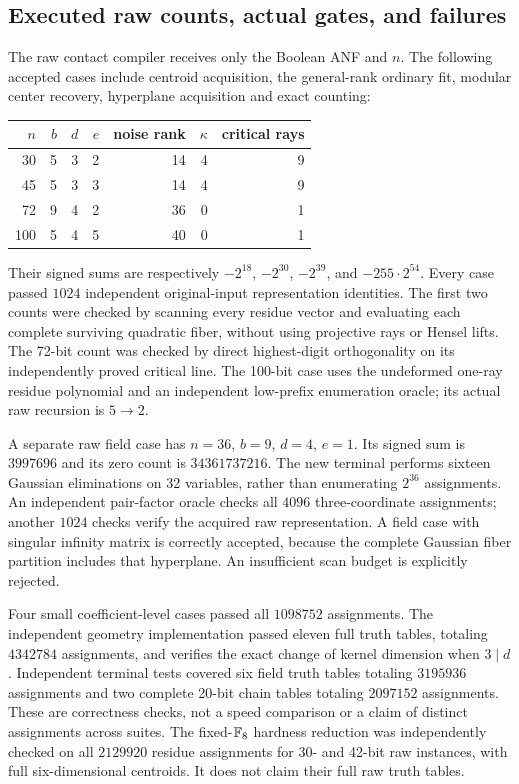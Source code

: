 \subsection{Executed raw counts, actual gates, and failures}
The raw contact compiler receives only the Boolean ANF and $n$.
The following accepted cases include centroid acquisition, the general-rank
ordinary fit, modular center recovery, hyperplane acquisition and exact counting:
\begin{center}
\small
\begin{tabular}{rrrrrrr}
\toprule
$n$&$b$&$d$&$e$&noise rank&$\kappa$&critical rays\\
\midrule
30&5&3&2&14&4&9\\
45&5&3&3&14&4&9\\
72&9&4&2&36&0&1\\
100&5&4&5&40&0&1\\
\bottomrule
\end{tabular}
\end{center}
Their signed sums are respectively $-2^{18}$, $-2^{30}$, $-2^{39}$,
and $-255\cdot2^{54}$. Every case passed $1024$ independent original-input
representation identities. The first two counts were checked by scanning
every residue vector and evaluating each complete surviving quadratic
fiber, without using projective rays or Hensel lifts. The 72-bit count
was checked by direct highest-digit orthogonality on its independently
proved critical line. The 100-bit case uses the undeformed one-ray
residue polynomial and an independent low-prefix enumeration oracle;
its actual raw recursion is $5\to2$.

A separate raw field case has $n=36$, $b=9$, $d=4$, $e=1$. Its signed
sum is $3997696$ and its zero count is $34361737216$. The new terminal
performs sixteen Gaussian eliminations on 32 variables, rather than
enumerating $2^{36}$ assignments. An independent pair-factor oracle
checks all $4096$ three-coordinate assignments; another $1024$ checks
verify the acquired raw representation. A field case with singular
infinity matrix is correctly accepted, because the complete Gaussian
fiber partition includes that hyperplane. An insufficient scan budget
is explicitly rejected.

Four small coefficient-level cases passed all $1098752$ assignments.
The independent geometry implementation passed eleven full truth tables,
totaling $4342784$ assignments, and verifies the exact change of kernel
dimension when $3\mid d$. Independent terminal tests covered six field
truth tables totaling $3195936$ assignments and two complete 20-bit
chain tables totaling $2097152$ assignments. These are correctness checks,
not a speed comparison or a claim of distinct assignments across suites.
The fixed-$\mathbb F_8$ hardness reduction was independently checked on all
$2129920$ residue assignments for 30- and 42-bit raw instances, with full
six-dimensional centroids. It does not claim their full raw truth tables.

